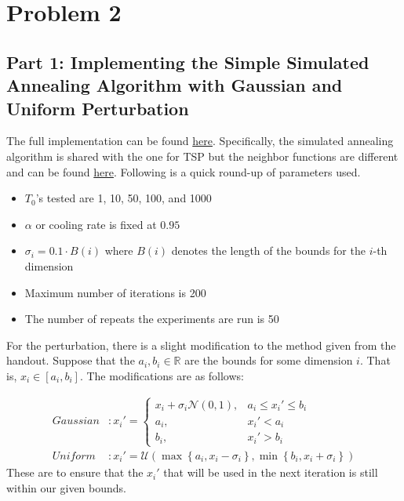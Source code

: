 \section*{Problem 2}

\subsection*{Part 1: Implementing the Simple Simulated Annealing Algorithm with Gaussian and Uniform Perturbation}

The full implementation can be found \href{https://github.com/nngerncham/ma395_heuristic/tree/main/homework/hw2/code/simulated_annealing}{here}. Specifically, the simulated annealing algorithm is shared with the one for TSP but the neighbor functions are different and can be found \href{https://github.com/nngerncham/ma395_heuristic/blob/main/homework/hw2/code/simulated_annealing/cont_neighbors.py}{here}. Following is a quick round-up of parameters used.
\begin{itemize}
    \item \(T_0\)'s tested are 1, 10, 50, 100, and 1000
    \item \(\alpha\) or cooling rate is fixed at \(0.95\)
    \item \(\sigma_i = 0.1 \cdot B(i)\) where \(B(i)\) denotes the length of the bounds for the \(i\)-th dimension
    \item Maximum number of iterations is 200
    \item The number of repeats the experiments are run is 50
\end{itemize}

For the perturbation, there is a slight modification to the method given from the handout. Suppose that the \(a_i, b_i \in \mathbb{R}\) are the bounds for some dimension \(i\). That is, \(x_i \in [a_i, b_i]\). The modifications are as follows:

\[
\begin{aligned}
    \textit{Gaussian} &:
        x_i' = \begin{cases}
            x_i + \sigma_i\mathcal{N}(0, 1), & a_i \leq x_i' \leq b_i \\
            a_i, & x_i' < a_i \\
            b_i, & x_i' > b_i
        \end{cases} \\
    \textit{Uniform} &:
        x_i' = \mathcal{U}\left(\max\left\{a_i, x_i-\sigma_i\right\}, \min\left\{b_i, x_i+\sigma_i\right\}\right)
\end{aligned}
\]
These are to ensure that the \(x_i'\) that will be used in the next iteration is still within our given bounds.

